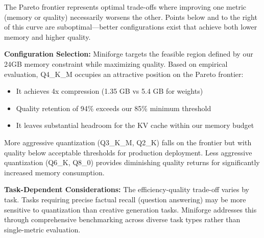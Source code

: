 The Pareto frontier represents optimal trade-offs where improving one metric (memory or quality) necessarily worsens the other. Points below and to the right of this curve are suboptimal---better configurations exist that achieve both lower memory and higher quality.

\textbf{Configuration Selection:} Miniforge targets the feasible region defined by our 24GB memory constraint while maximizing quality. Based on empirical evaluation, Q4\_K\_M occupies an attractive position on the Pareto frontier:
\begin{itemize}
    \item It achieves 4x compression (1.35 GB vs 5.4 GB for weights)
    \item Quality retention of 94\% exceeds our 85\% minimum threshold
    \item It leaves substantial headroom for the KV cache within our memory budget
\end{itemize}

More aggressive quantization (Q3\_K\_M, Q2\_K) falls on the frontier but with quality below acceptable thresholds for production deployment. Less aggressive quantization (Q6\_K, Q8\_0) provides diminishing quality returns for significantly increased memory consumption.

\textbf{Task-Dependent Considerations:} The efficiency-quality trade-off varies by task. Tasks requiring precise factual recall (question answering) may be more sensitive to quantization than creative generation tasks. Miniforge addresses this through comprehensive benchmarking across diverse task types rather than single-metric evaluation.
